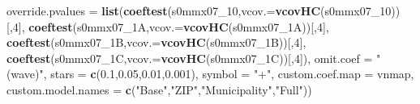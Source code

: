 \documentclass[
]{article}
\newenvironment{Shaded}{\begin{snugshade}}{\end{snugshade}}
\newcommand{\DataTypeTok}[1]{\textcolor[rgb]{0.13,0.29,0.53}{#1}}
\newcommand{\DecValTok}[1]{\textcolor[rgb]{0.00,0.00,0.81}{#1}}
\newcommand{\FloatTok}[1]{\textcolor[rgb]{0.00,0.00,0.81}{#1}}
\newcommand{\KeywordTok}[1]{\textcolor[rgb]{0.13,0.29,0.53}{\textbf{#1}}}
\newcommand{\NormalTok}[1]{#1}
\newcommand{\StringTok}[1]{\textcolor[rgb]{0.31,0.60,0.02}{#1}}
\begin{document}
\begin{Shaded}
\begin{Highlighting}[]
          \DataTypeTok{override.pvalues =} \KeywordTok{list}\NormalTok{(}\KeywordTok{coeftest}\NormalTok{(s0mmx07_}\DecValTok{10}\NormalTok{,}\DataTypeTok{vcov.=}\KeywordTok{vcovHC}\NormalTok{(s0mmx07_}\DecValTok{10}\NormalTok{))[,}\DecValTok{4}\NormalTok{],}
                                  \KeywordTok{coeftest}\NormalTok{(s0mmx07_1A,}\DataTypeTok{vcov.=}\KeywordTok{vcovHC}\NormalTok{(s0mmx07_1A))[,}\DecValTok{4}\NormalTok{],}
                                  \KeywordTok{coeftest}\NormalTok{(s0mmx07_1B,}\DataTypeTok{vcov.=}\KeywordTok{vcovHC}\NormalTok{(s0mmx07_1B))[,}\DecValTok{4}\NormalTok{],}
                                  \KeywordTok{coeftest}\NormalTok{(s0mmx07_1C,}\DataTypeTok{vcov.=}\KeywordTok{vcovHC}\NormalTok{(s0mmx07_1C))[,}\DecValTok{4}\NormalTok{]),}
          \DataTypeTok{omit.coef =} \StringTok{"(wave)"}\NormalTok{, }\DataTypeTok{stars =} \KeywordTok{c}\NormalTok{(}\FloatTok{0.1}\NormalTok{,}\FloatTok{0.05}\NormalTok{,}\FloatTok{0.01}\NormalTok{,}\FloatTok{0.001}\NormalTok{), }\DataTypeTok{symbol =} \StringTok{"+"}\NormalTok{,}
          \DataTypeTok{custom.coef.map =}\NormalTok{ vnmap, }
          \DataTypeTok{custom.model.names =} \KeywordTok{c}\NormalTok{(}\StringTok{"Base"}\NormalTok{,}\StringTok{"ZIP"}\NormalTok{,}\StringTok{"Municipality"}\NormalTok{,}\StringTok{"Full"}\NormalTok{))}
\end{Highlighting}
\end{Shaded}
\end{document}
